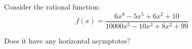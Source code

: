 \documentclass{ximera}
\author{Ivo Terek}
\begin{document}
\begin{exercise}

  Consider the rational function:
  $$  f(x) = \frac{6x^8-5x^5+6x^2+10}{10000x^5 - 10x^3+8x^2+99}  $$

  Does it have any horizontal asymptotes?

  \begin{multipleChoice}
  \end{multipleChoice}

\end{exercise}
\end{document}
